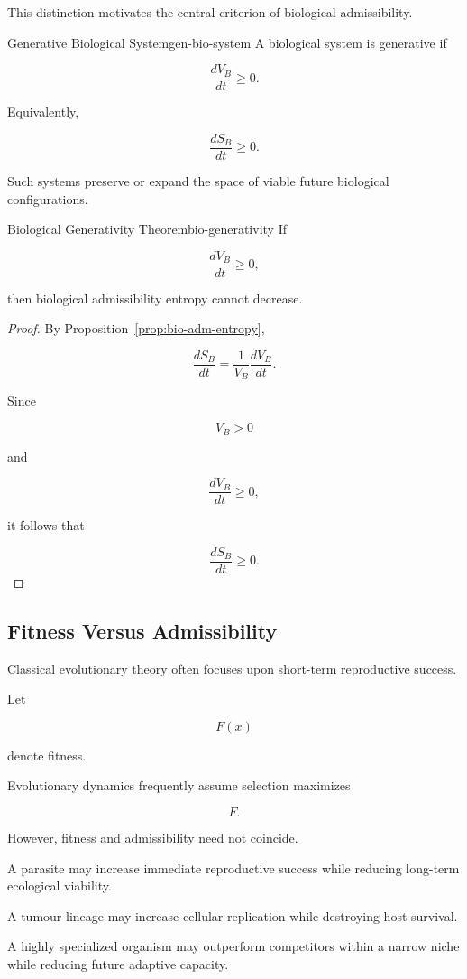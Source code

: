 \documentclass[12pt,twoside,openright]{book}
\newenvironment{ex}
{\begin{example}{}{}}
{\end{example}}
\begin{document}
This distinction motivates the central criterion of
biological admissibility.

\begin{definition}{Generative Biological System}{gen-bio-system}
A biological system is generative if

\[
\frac{dV_B}{dt}
\ge 0.
\]
\end{definition}

Equivalently,

\[
\frac{dS_B}{dt}
\ge 0.
\]

Such systems preserve or expand the space of viable
future biological configurations.

\begin{theorem}{Biological Generativity Theorem}{bio-generativity}
If

\[
\frac{dV_B}{dt}
\ge 0,
\]

then biological admissibility entropy cannot decrease.
\end{theorem}

\begin{proof}
By Proposition~\ref{prop:bio-adm-entropy},

\[
\frac{dS_B}{dt}
=
\frac{1}{V_B}
\frac{dV_B}{dt}.
\]

Since

\[
V_B>0
\]

and

\[
\frac{dV_B}{dt}\ge0,
\]

it follows that

\[
\frac{dS_B}{dt}\ge0.
\]
\end{proof}

\subsection{Fitness Versus Admissibility}

Classical evolutionary theory often focuses upon
short-term reproductive success.

Let

\[
F(x)
\]

denote fitness.

Evolutionary dynamics frequently assume selection
maximizes

\[
F.
\]

However, fitness and admissibility need not coincide.

\begin{ex}
A parasite may increase immediate reproductive success
while reducing long-term ecological viability.

A tumour lineage may increase cellular replication while
destroying host survival.

A highly specialized organism may outperform competitors
within a narrow niche while reducing future adaptive
capacity.
\end{ex}
\end{document}
